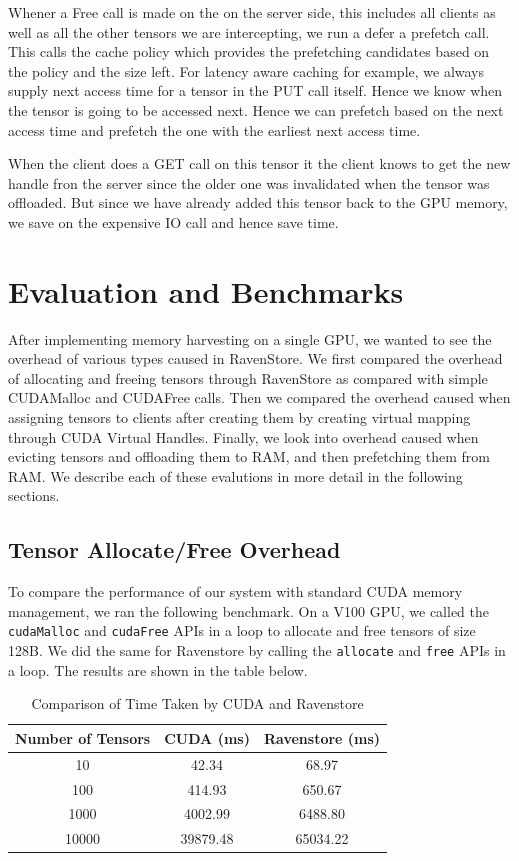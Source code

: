 \documentclass{article}
\begin{document}
Whener a Free call is made on the on the server side, this includes all clients as well as all the other tensors we are intercepting, we run a defer a prefetch call. This calls the cache policy
which provides the prefetching candidates based on the policy and the size left. For latency aware caching for example, we always supply next access time for a tensor
in the PUT call itself. Hence we know when the tensor is going to be accessed next. Hence we can prefetch based on the next access time and prefetch the one with the earliest next access time.

When the client does a GET call on this tensor it the client knows to get the new handle fron the server since the older one was invalidated when the tensor was offloaded. But since we have already
added this tensor back to the GPU memory, we save on the expensive IO call and hence save time.


\section{Evaluation and Benchmarks}
After implementing memory harvesting on a single GPU, we wanted to see the overhead of various types caused in RavenStore.
We first compared the overhead of allocating and freeing tensors through RavenStore as compared with simple CUDAMalloc and CUDAFree
calls. Then we compared the overhead caused when assigning tensors to clients after creating them by creating virtual mapping through CUDA
Virtual Handles. Finally, we look into overhead caused when evicting tensors and offloading them to RAM, and then prefetching them from RAM.
We describe each of these evalutions in more detail in the following sections.
\subsection{Tensor Allocate/Free Overhead}
To compare the performance of our system with standard CUDA memory management, we ran the following benchmark.
On a V100 GPU, we called the \verb|cudaMalloc| and \verb|cudaFree| APIs in a loop to allocate and free tensors of size 128B. We did the same for Ravenstore by calling the \verb|allocate| and \verb|free| APIs in a loop.
The results are shown in the table below.
\begin{table}[htbp]
	\centering
	\begin{tabular}{||c|c|c||}
		\hline
		\textbf{Number of Tensors} & \textbf{CUDA (ms)} & \textbf{Ravenstore (ms)} \\
		\hline
		\hline
		10 & 42.34 & 68.97 \\
		100 & 414.93 & 650.67 \\
		1000 & 4002.99 & 6488.80 \\
		10000 & 39879.48 & 65034.22 \\
		\hline
	\end{tabular}
	\caption{Comparison of Time Taken by CUDA and Ravenstore}
\end{table}
\end{document}
